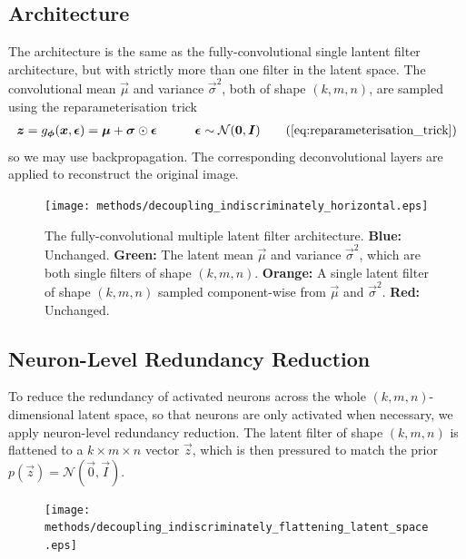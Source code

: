 \subsection{Architecture}
The architecture is the same as the fully-convolutional single lantent filter architecture, but with strictly more than one filter in the latent space. The convolutional mean $\vec{\mu}$ and variance $\vec{\sigma}^2$, both of shape $(k, m, n)$, are sampled using the reparameterisation trick
\begin{align}
\vec{z} = g_{\vec{\phi}}(\vec{x}, \vec{\epsilon}) = \vec{\mu} + \vec{\sigma} \odot \vec{\epsilon} \quad\quad\quad \vec{\epsilon} \sim \mathcal{N}(\vec{0}, \vec{I})
\tag{\ref{eq:reparameterisation_trick}}
\end{align}
so we may use backpropagation. The corresponding deconvolutional layers are applied to reconstruct the original image.\\

\begin{figure}[h!]
\centering
\captionsetup{justification=centering}
\texttt{[image: methods/decoupling\_indiscriminately\_horizontal.eps]}
\caption{The fully-convolutional multiple latent filter architecture. \textbf{Blue:} Unchanged. \textbf{Green:} The latent mean $\vec{\mu}$ and variance $\vec{\sigma}^2$, which are both single filters of shape $(k, m, n)$. \textbf{Orange:} A single latent filter of shape $(k, m, n)$ sampled component-wise from $\vec{\mu}$ and $\vec{\sigma}^2$. \textbf{Red:} Unchanged.}
\label{fig:decoupling_indiscriminately_horizontal}
\end{figure}

%
%
\subsection{Neuron-Level Redundancy Reduction}
To reduce the redundancy of activated neurons across the whole $(k, m, n)$-dimensional latent space, so that neurons are only activated when necessary, we apply neuron-level redundancy reduction. The latent filter of shape $(k, m, n)$ is flattened to a $k \times m \times n$ vector $\vec{z}$, which is then pressured to match the prior $p(\vec{z}) = \mathcal{N}(\vec{0}, \vec{I})$.\\

\begin{figure}[h!]
\centering
\captionsetup{justification=centering}
\texttt{[image: methods/decoupling\_indiscriminately\_flattening\_latent\_space.eps]}
\label{fig:decoupling_indiscriminately_flattening_latent_space}
\end{figure}

